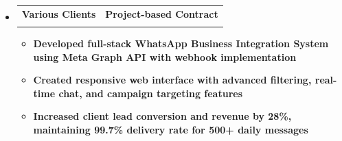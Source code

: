 \documentclass[letterpaper,11pt]{article}
\makeatletter
\newcommand{\resumeItem}[1]{\item\small{\bfseries\color{textblack}#1}\vspace{-2pt}}
\newcommand{\resumeSubheading}[4]{
  \item\small{
    \begin{tabular*}{0.97\textwidth}[t]{l@{\extracolsep{\fill}}r}
      \textbf{\large\color{headingblack}#1} & \textbf{\color{textblack}#2} \\
      \textbf{\color{textblack}\textit{#3}} & \textbf{\color{textblack}\textit{#4}} \\
    \end{tabular*}\vspace{-7pt}
  }
}
\renewcommand{\textbf}[1]{{\bfseries\color{headingblack}#1}}
\renewcommand{\textit}[1]{{\itshape\bfseries\color{textblack}#1}}
\makeatother
\begin{document}
\begin{itemize}[leftmargin=*]
\vspace{1mm}

\resumeSubheading
    {Various Clients}{Project-based Contract}
    {Freelance Full Stack Developer}{Remote}
    \begin{itemize}[leftmargin=*]
        \resumeItem{Developed full-stack WhatsApp Business Integration System using Meta Graph API with webhook implementation}
        \resumeItem{Created responsive web interface with advanced filtering, real-time chat, and campaign targeting features}
        \resumeItem{Increased client lead conversion and revenue by \textbf{28\%}, maintaining \textbf{99.7\% delivery rate} for \textbf{500+ daily messages}}
    \end{itemize}
\end{itemize}

\pagebreak

\end{document}
